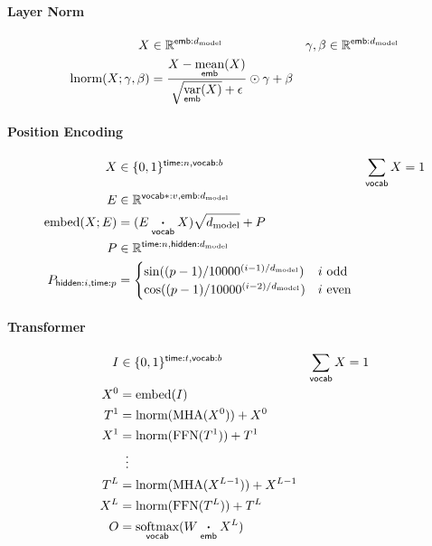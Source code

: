 \documentclass{article}
\newcommand{\reals}[0]{\mathbb{R}}
\newcommand{\dmodel}{d_{\text{model}}}
\begin{document}
\paragraph{Layer Norm}

\begin{align*} 
X &\in \reals^{\nset{emb}{\dmodel}} & \gamma, \beta &\in \reals^{\nset{emb}{\dmodel}} \\
\text{lnorm}(X; \gamma, \beta) &= \frac{X - \nfun{emb}{\text{mean}}(X)}{\sqrt{\nfun{emb}{\text{var}}(X)} + \epsilon} \odot \gamma + \beta 
\end{align*}

\paragraph{Position Encoding}
\begin{align*} 
X &\in \{0, 1\}^{\nset{time}{n}, \nset{vocab}{b}} & \nsum{vocab} X &= 1\\
E &\in \reals^{\nset{vocab*}{v}, \nset{emb}{\dmodel}} \\
\text{embed}(X; E) &= (E \ndot{vocab} X)\sqrt{\dmodel} + P \\
P &\in \reals^{\nset{time}{n}, \nset{hidden}{\dmodel}} \\
P_{\nidx{hidden}{i}, \nidx{time}{p}} &= \begin{cases}
  \sin((p-1) / 10000^{(i-1) / \dmodel}) & \text{$i$ odd} \\ 
  \cos((p-1) / 10000^{(i-2) / \dmodel}) & \text{$i$ even} \\
\end{cases} \\
\end{align*}

\paragraph{Transformer}

\begin{align*} 
I &\in \{0, 1\}^{{\nset{time}{t}, \nset{vocab}{b}}} & \nsum{vocab} X &= 1\\
X^0 &= \text{embed}(I)\\
T^1 &= \text{lnorm}(\text{MHA}(X^0)) + X^0\\
X^1 &= \text{lnorm}(\text{FFN}(T^1)) + T^1\\
&\vdotswithin{=} \\
T^{L} &= \text{lnorm}(\text{MHA}(X^{L-1})) + X^{L-1}\\
X^{L} &= \text{lnorm}(\text{FFN}(T^L)) + T^L\\
O &= \nfun{vocab}{softmax}(W \ndot{emb} X^L)
\end{align*}


\end{document}
